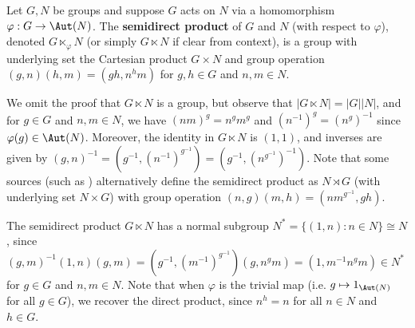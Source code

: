\begin{definition}\label{def:semidirect_product}
    Let $G,N$ be groups and suppose $G$ acts on $N$ via a homomorphism $\varphi : G \to \Aut(N)$. The \textbf{semidirect product} of $G$ and $N$ (with respect to $\varphi$), denoted $G \ltimes_\varphi N$ (or simply $G \ltimes N$ if clear from context), is a group with underlying set the Cartesian product $G \times N$ and group operation $(g,n)(h,m) = (gh,n^hm)$ for $g,h \in G$ and $n,m \in N$.
\end{definition}

We omit the proof that $G \ltimes N$ is a group, but observe that $|G \ltimes N| = |G||N|$, and for $g \in G$ and $n,m \in N$, we have $(nm)^g = n^g m^g$ and $(n^{-1})^g = (n^g)^{-1}$ since $\varphi(g) \in \Aut(N)$. Moreover, the identity in $G \ltimes N$ is $(1,1)$, and inverses are given by $(g,n)^{-1} = (g^{-1},(n^{-1})^{g^{-1}}) = (g^{-1},(n^{g^{-1}})^{-1})$. Note that some sources (such as \cite{dixon_mortimer_perm_groups1996}) alternatively define the semidirect product as $N \rtimes G$ (with underlying set $N \times G$) with group operation $(n,g)(m,h) = (nm^{g^{-1}},gh)$.

The semidirect product $G \ltimes N$ has  a normal subgroup $N^* = \{(1,n) : n \in N\} \cong N$, since $(g,m)^{-1}(1,n)(g,m) = (g^{-1},(m^{-1})^{g^{-1}})(g,n^gm) = (1,m^{-1}n^gm) \in N^*$ for $g \in G$ and $n,m \in N$. Note that when $\varphi$ is the trivial map (i.e. $g \mapsto 1_{\Aut(N)}$ for all $g \in G$), we recover the direct product, since $n^h = n$ for all $n \in N$ and $h \in G$.

